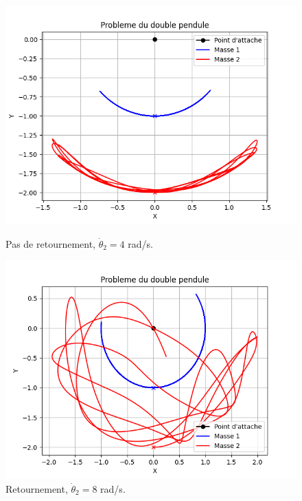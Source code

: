 \begin{figure} [htbp!]
	\begin{minipage}[c]{0.45\textwidth}
		\centering
		\includegraphics[width=\textwidth]{res/no_retournement.png}
		\caption{Pas de retournement, $\dot \theta_2 = 4$ rad/s.}
		\label{fig:no_retournement}
	\end{minipage}\hfill
	\begin{minipage}[c]{0.45\textwidth}
		\centering
		\includegraphics[width=\textwidth]{res/retournement.png}
		\caption{Retournement, $\dot \theta_2 = 8$ rad/s.}
		\label{fig:retournement}
	\end{minipage}
\end{figure}
